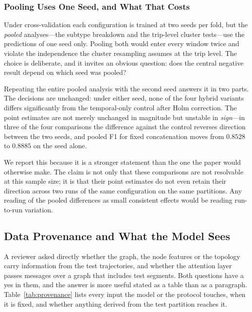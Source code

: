 \documentclass[journal]{IEEEtran}
\begin{document}
\subsubsection{Pooling Uses One Seed, and What That Costs}
\label{sec:pooling_seed}
Under cross-validation each configuration is trained at two seeds per fold,
but the \emph{pooled} analyses---the subtype breakdown and the trip-level
cluster tests---use the predictions of one seed only. Pooling both would
enter every window twice and violate the independence the cluster resampling
assumes at the trip level. The choice is deliberate, and it invites an
obvious question: does the central negative result depend on which seed was
pooled?

Repeating the entire pooled analysis with the second seed answers it in two
parts. The decisions are unchanged: under either seed, none of the four
hybrid variants differs significantly from the temporal-only control after
Holm correction. The point estimates are not merely unchanged in magnitude
but unstable in \emph{sign}---in three of the four comparisons the difference
against the control reverses direction between the two seeds, and pooled F1
for fixed concatenation moves from $0.8528$ to $0.8885$ on the seed alone.

We report this because it is a stronger statement than the one the paper
would otherwise make. The claim is not only that these comparisons are not
resolvable at this sample size; it is that their point estimates do not even
retain their direction across two runs of the same configuration on the same
partitions. Any reading of the pooled differences as small consistent effects
would be reading run-to-run variation.

\subsection{Data Provenance and What the Model Sees}
\label{sec:provenance}
A reviewer asked directly whether the graph, the node features or the topology carry information from the test trajectories, and whether the attention layer passes messages over a graph that includes test segments. Both questions have a yes in them, and the answer is more useful stated as a table than as a paragraph. Table~\ref{tab:provenance} lists every input the model or the protocol touches, when it is fixed, and whether anything derived from the test partition reaches it.
\end{document}
